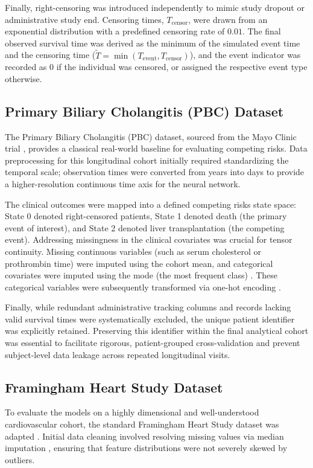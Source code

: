 \documentclass[a4paper,twoside,12pt]{report}
\begin{document}
Finally, right-censoring was introduced independently to mimic study dropout or administrative study end. Censoring times, $T_{\text{censor}}$, were drawn from an exponential distribution with a predefined censoring rate of $0.01$. The final observed survival time was derived as the minimum of the simulated event time and the censoring time ($\tilde{T} = \min(T_{\text{event}}, T_{\text{censor}})$), and the event indicator was recorded as 0 if the individual was censored, or assigned the respective event type otherwise.

\subsection{Primary Biliary Cholangitis (PBC) Dataset}
The Primary Biliary Cholangitis (PBC) dataset, sourced from the Mayo Clinic trial \cite{fleming1991counting, murtaugh1994primary}, provides a classical real-world baseline for evaluating competing risks. Data preprocessing for this longitudinal cohort initially required standardizing the temporal scale; observation times were converted from years into days to provide a higher-resolution continuous time axis for the neural network. 

The clinical outcomes were mapped into a defined competing risks state space: State 0 denoted right-censored patients, State 1 denoted death (the primary event of interest), and State 2 denoted liver transplantation (the competing event). Addressing missingness in the clinical covariates was crucial for tensor continuity. Missing continuous variables (such as serum cholesterol or prothrombin time) were imputed using the cohort mean, and categorical covariates were imputed using the mode (the most frequent class) \citep{little2019statistical}. These categorical variables were subsequently transformed via one-hot encoding \citep{bishop2006, kuhn2013applied}. 

Finally, while redundant administrative tracking columns and records lacking valid survival times were systematically excluded, the unique patient identifier was explicitly retained. Preserving this identifier within the final analytical cohort was essential to facilitate rigorous, patient-grouped cross-validation and prevent subject-level data leakage across repeated longitudinal visits.

\subsection{Framingham Heart Study Dataset}
To evaluate the models on a highly dimensional and well-understood cardiovascular cohort, the standard Framingham Heart Study dataset was adapted \citep{InterpretableFineGray2025}. Initial data cleaning involved resolving missing values via median imputation \cite{little2019statistical}, ensuring that feature distributions were not severely skewed by outliers. 
\end{document}
